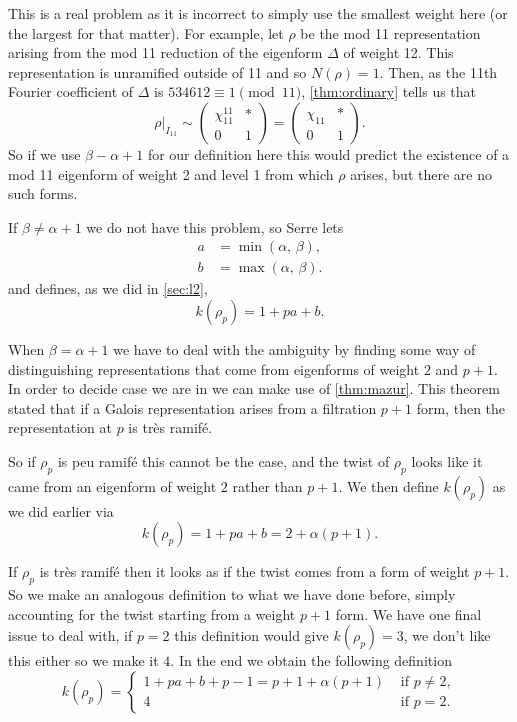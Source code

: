 \documentclass[a4paper,12pt]{article}
\begin{document}
This is a real problem as it is incorrect to simply use the smallest weight here (or the largest for that matter).
For example, let $\rho$ be the mod 11 representation arising from the mod 11 reduction of the eigenform $\Delta$ of weight 12.
This representation is unramified outside of 11 and so $N(\rho) =1$.
Then, as the 11th Fourier coefficient of $\Delta$ is $534612\equiv 1 \pmod{11}$, \cref{thm:ordinary} tells us that
\[
\rho|_{I_{11}} \sim \begin{pmatrix} \chi_{11}^{11} & * \\ 0 & 1\end{pmatrix} = \begin{pmatrix} \chi_{11} & * \\ 0 & 1\end{pmatrix}.
\]
So if we use $\beta - \alpha + 1$ for our definition here this would predict the existence of a mod 11 eigenform of weight 2 and level 1 from which $\rho$ arises, but there are no such forms.

If $\beta \ne \alpha + 1$ we do not have this problem, so Serre lets
\begin{align*}
a &= \min(\alpha,\, \beta),\\
b &= \max(\alpha,\, \beta).
\end{align*}
and defines, as we did in \cref{sec:l2},
\begin{equation}\label{eq:l1nt}
k(\rho_p) = 1 + pa + b. %
\end{equation}

When $\beta = \alpha + 1$ we have to deal with the ambiguity by finding some way of distinguishing representations that come from eigenforms of weight $2$ and $p + 1$.
In order to decide case we are in we can make use of \cref{thm:mazur}.
This theorem stated that if a Galois representation arises from a filtration $p+1$ form, then the representation at $p$ is tr\`es ramif\'e.

So if $\rho_p$ is peu ramif\'e this cannot be the case, and the twist of $\rho_p$ looks like it came from an eigenform of weight $2$ rather than $p+1$.
We then define $k(\rho_p)$ as we did earlier via
\begin{equation}\label{eq:peu}
k(\rho_p) = 1 + pa + b = 2 + \alpha(p+1).
\end{equation}

If $\rho_p$ is tr\`es ramif\'e then it looks as if the twist comes from a form of weight $p+1$.
So we make an analogous definition to what we have done before, simply accounting for the twist starting from a weight $p+1$ form.
We have one final issue to deal with, if $p=2$ this definition would give $k(\rho_p) = 3$, we don't like this either so we make it $4$.
In the end we obtain the following definition
\begin{equation}\label{eq:tres}
k(\rho_p) = \begin{cases}
1 + pa + b + p - 1 = p + 1 + \alpha(p+1) & \text{ if }p\ne 2,\\
4 & \text{ if } p = 2.
\end{cases}
\end{equation}
\end{document}
